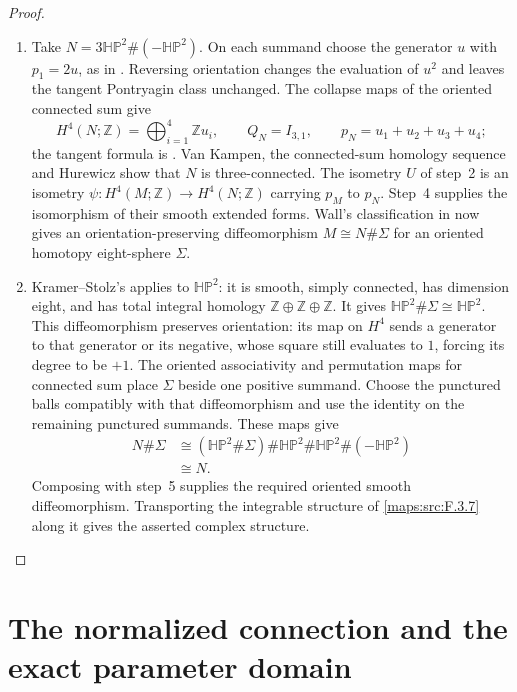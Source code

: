 \documentclass[11pt,a4paper]{article}
\theoremstyle{definition}
\begin{document}
\begin{proof}
\begin{enumerate}[label=\arabic*.]
\item Take $N=3\mathbb H\mathbb P^2\#(-\mathbb H\mathbb P^2)$.
On each summand choose the generator $u$ with $p_1=2u$, as in
\cite[Lemma~2.1, p.~5]{ffMandal}. Reversing orientation changes
the evaluation of $u^2$ and leaves the tangent Pontryagin class
unchanged. The collapse maps of the oriented connected sum give
\[
H^4(N;\mathbb Z)=\bigoplus_{i=1}^4\mathbb Z u_i,
\qquad Q_N=I_{3,1},\qquad p_N=u_1+u_2+u_3+u_4;
\]
the tangent formula is
\cite[Theorem~2.4, p.~7]{ffMandal}.
Van Kampen, the connected-sum homology sequence and Hurewicz show
that $N$ is three-connected. The isometry $U$ of step~2 is an
isometry $\psi:H^4(M;\mathbb Z)\to H^4(N;\mathbb Z)$ carrying
$p_M$ to $p_N$. Step~4 supplies the isomorphism of their smooth
extended forms. Wall's classification in
\cite[Theorem~3.7(1), pp.~13--14]{IVVWallForm} now gives an
orientation-preserving diffeomorphism
$M\cong N\#\Sigma$ for an oriented homotopy eight-sphere $\Sigma$.

\item Kramer--Stolz's
\cite[Theorem~A, p.~178]{IVVKramerStolz} applies to
$\mathbb H\mathbb P^2$: it is smooth, simply connected, has dimension
eight, and has total integral homology $\mathbb Z\oplus\mathbb Z
\oplus\mathbb Z$. It gives
$\mathbb H\mathbb P^2\#\Sigma\cong\mathbb H\mathbb P^2$.
This diffeomorphism preserves orientation: its map on $H^4$ sends
a generator to that generator or its negative, whose square still
evaluates to $1$, forcing its degree to be $+1$.
The oriented associativity and permutation maps for connected sum
place $\Sigma$ beside one positive summand. Choose the punctured
balls compatibly with that diffeomorphism and use the identity on
the remaining punctured summands. These maps give
\[
\begin{aligned}
N\#\Sigma
&\cong(\mathbb H\mathbb P^2\#\Sigma)\#\mathbb H\mathbb P^2
       \#\mathbb H\mathbb P^2\#(-\mathbb H\mathbb P^2)\\
&\cong N.
\end{aligned}
\]
Composing with step~5 supplies the required oriented smooth
diffeomorphism. Transporting the integrable structure of
\cref{maps:src:F.3.7} along it gives the asserted complex structure.
\end{enumerate}
\end{proof}


\section{The normalized connection and the exact parameter domain}
\end{document}
